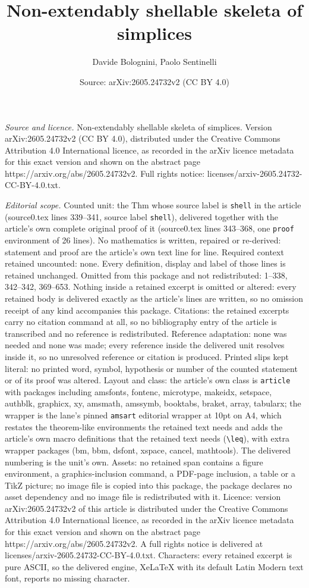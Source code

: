 \documentclass[10pt,a4paper]{amsart}
\title[Non-extendably shellable skeleta of simplices]{Non-extendably shellable skeleta of simplices}
\author{Davide Bolognini, Paolo Sentinelli}
\date{Source: arXiv:2605.24732v2 (CC BY 4.0)}
\begin{document}
\maketitle

\noindent\emph{Source and licence.} Non-extendably shellable skeleta of simplices. Version arXiv:2605.24732v2 (CC BY 4.0), distributed under the Creative Commons Attribution 4.0 International licence, as recorded in the arXiv licence metadata for this exact version and shown on the abstract page https://arxiv.org/abs/2605.24732v2. Full rights notice: licenses/arxiv-2605.24732-CC-BY-4.0.txt.\par\smallskip

\noindent\textit{Editorial scope.} Counted unit: the Thm whose source label is \texttt{shell} in the article (source0.tex lines 339--341, source label \texttt{shell}), delivered together with the article's own complete original proof of it (source0.tex lines 343--368, one \texttt{proof} environment of 26 lines). No mathematics is written, repaired or re-derived: statement and proof are the article's own text line for line. Required context retained uncounted: none. Every definition, display and label of those lines is retained unchanged. Omitted from this package and not redistributed: 1--338, 342--342, 369--653. Nothing inside a retained excerpt is omitted or altered: every retained body is delivered exactly as the article's lines are written, so no omission receipt of any kind accompanies this package. Citations: the retained excerpts carry no citation command at all, so no bibliography entry of the article is transcribed and no reference is redistributed. Reference adaptation: none was needed and none was made; every reference inside the delivered unit resolves inside it, so no unresolved reference or citation is produced. Printed slips kept literal: no printed word, symbol, hypothesis or number of the counted statement or of its proof was altered. Layout and class: the article's own class is \texttt{article} with packages including amsfonts, fontenc, microtype, makeidx, setspace, authblk, graphicx, xy, amsmath, amssymb, booktabs, braket, array, tabularx; the wrapper is the lane's pinned \texttt{amsart} editorial wrapper at 10pt on A4, which restates the theorem-like environments the retained text needs and adds the article's own macro definitions that the retained text needs (\texttt{\textbackslash leq}), with extra wrapper packages (bm, bbm, dsfont, xspace, cancel, mathtools). The delivered numbering is the unit's own. Assets: no retained span contains a figure environment, a graphics-inclusion command, a PDF-page inclusion, a table or a TikZ picture; no image file is copied into this package, the package declares no asset dependency and no image file is redistributed with it. Licence: version arXiv:2605.24732v2 of this article is distributed under the Creative Commons Attribution 4.0 International licence, as recorded in the arXiv licence metadata for this exact version and shown on the abstract page https://arxiv.org/abs/2605.24732v2. A full rights notice is delivered at licenses/arxiv-2605.24732-CC-BY-4.0.txt. Characters: every retained excerpt is pure ASCII, so the delivered engine, XeLaTeX with its default Latin Modern text font, reports no missing character.
\end{document}
